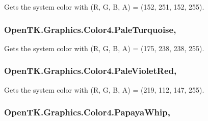 Gets the system color with (R, G, B, A) = (152, 251, 152, 255). 

\hypertarget{struct_open_t_k_1_1_graphics_1_1_color4_abbea7a75f1474260274ede8e11fe15c6}{
\subsubsection[{Pale\-Turquoise}]{ Open\-T\-K.\-Graphics.\-Color4.\-Pale\-Turquoise\hspace{0.3cm}{\ttfamily [static]}, {\ttfamily [get]}}}\label{struct_open_t_k_1_1_graphics_1_1_color4_abbea7a75f1474260274ede8e11fe15c6}


Gets the system color with (R, G, B, A) = (175, 238, 238, 255). 

\hypertarget{struct_open_t_k_1_1_graphics_1_1_color4_a7887d0bfdd73e5f14be9484169bd89a9}{
\subsubsection[{Pale\-Violet\-Red}]{ Open\-T\-K.\-Graphics.\-Color4.\-Pale\-Violet\-Red\hspace{0.3cm}{\ttfamily [static]}, {\ttfamily [get]}}}\label{struct_open_t_k_1_1_graphics_1_1_color4_a7887d0bfdd73e5f14be9484169bd89a9}


Gets the system color with (R, G, B, A) = (219, 112, 147, 255). 

\hypertarget{struct_open_t_k_1_1_graphics_1_1_color4_a5fdcc205c4a91df03ab63f2b00f310bd}{
\subsubsection[{Papaya\-Whip}]{ Open\-T\-K.\-Graphics.\-Color4.\-Papaya\-Whip\hspace{0.3cm}{\ttfamily [static]}, {\ttfamily [get]}}}\label{struct_open_t_k_1_1_graphics_1_1_color4_a5fdcc205c4a91df03ab63f2b00f310bd}


